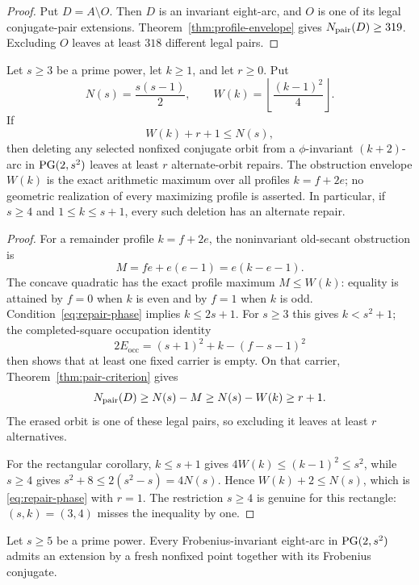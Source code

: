 \begin{proof}
Put $D=A\setminus O$.  Then $D$ is an invariant eight-arc, and $O$ is one
of its legal conjugate-pair extensions.  Theorem~\ref{thm:profile-envelope}
gives $N_{\mathrm{pair}}(D)\ge319$.  Excluding $O$ leaves at least $318$ different
legal pairs.
\end{proof}

\begin{theorem}
\label{thm:parameterized-repair}
Let $s\ge3$ be a prime power, let $k\ge1$, and let $r\ge0$.  Put
\[
  N(s)=\frac{s(s-1)}2,
  \qquad
  W(k)=\left\lfloor\frac{(k-1)^2}{4}\right\rfloor.
\]
If
\begin{equation}\label{eq:repair-phase}
  W(k)+r+1\le N(s),
\end{equation}
then deleting any selected nonfixed conjugate orbit from a $\phi$-invariant
$(k+2)$-arc in $\operatorname{PG}(2,s^2)$ leaves at least $r$ alternate-orbit repairs.
The obstruction envelope $W(k)$ is the exact arithmetic maximum over all
profiles $k=f+2e$; no geometric realization of every maximizing profile is
asserted.
In particular, if $s\ge4$ and $1\le k\le s+1$, every such deletion has an
alternate repair.
\end{theorem}

\begin{proof}
For a remainder profile $k=f+2e$, the noninvariant old-secant obstruction is
\[
  M=f e+e(e-1)=e(k-e-1).
\]
The concave quadratic has the exact profile maximum
$M\le W(k)$: equality is attained by $f=0$ when $k$ is even and by $f=1$
when $k$ is odd.  Condition~\eqref{eq:repair-phase} implies $k\le2s+1$.
For $s\ge3$ this gives $k<s^2+1$; the completed-square occupation identity
\[
  2E_{\mathrm{occ}}=(s+1)^2+k-(f-s-1)^2
\]
then shows that at least one fixed carrier is empty.  On that carrier,
Theorem~\ref{thm:pair-criterion} gives
\[
  N_{\mathrm{pair}}(D)\ge N(s)-M\ge N(s)-W(k)\ge r+1.
\]
The erased orbit is one of these legal pairs, so excluding it leaves at
least $r$ alternatives.

For the rectangular corollary, $k\le s+1$ gives
$4W(k)\le(k-1)^2\le s^2$, while $s\ge4$ gives
$s^2+8\le2(s^2-s)=4N(s)$.  Hence $W(k)+2\le N(s)$, which is
\eqref{eq:repair-phase} with $r=1$.  The restriction $s\ge4$ is genuine for
this rectangle: $(s,k)=(3,4)$ misses the inequality by one.
\end{proof}

\begin{corollary}\label{cor:all-orders}
Let $s\ge5$ be a prime power.  Every Frobenius-invariant eight-arc in
$\operatorname{PG}(2,s^2)$ admits an extension by a fresh nonfixed point together with
its Frobenius conjugate.
\end{corollary}

